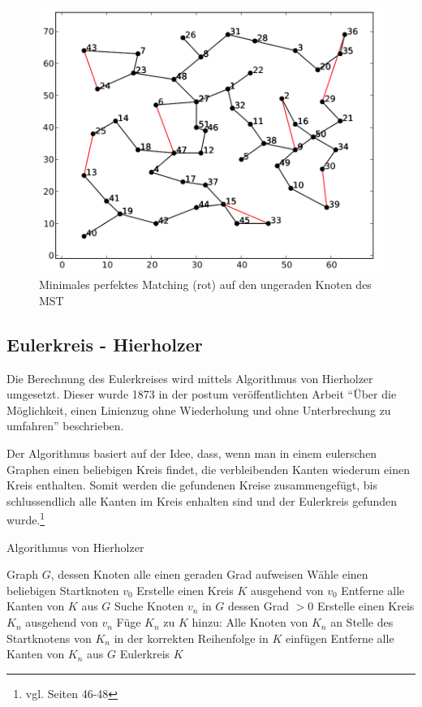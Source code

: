 \documentclass[11pt,a4paper]{article}
\begin{document}
\begin{figure}[H]
        \centering
        \includegraphics[width=12cm]{gfx/eil51_pm}
        \caption{Minimales perfektes Matching (rot) auf den ungeraden Knoten des MST}
        \label{img:eil51_pm}
\end{figure}

\newpage

\subsection{Eulerkreis - Hierholzer}
Die Berechnung des Eulerkreises wird mittels Algorithmus von Hierholzer umgesetzt. Dieser wurde 1873 in der postum veröffentlichten Arbeit "`Über die Möglichkeit, einen Linienzug ohne Wiederholung und ohne Unterbrechung zu umfahren"'\cite{hierholzer73} beschrieben.

Der Algorithmus basiert auf der Idee, dass, wenn man in einem eulerschen Graphen einen beliebigen Kreis findet, die verbleibenden Kanten wiederum einen Kreis enthalten. Somit werden die gefundenen Kreise zusammengefügt, bis schlussendlich alle Kanten im Kreis enhalten sind und der Eulerkreis gefunden wurde.\footnote{vgl. \cite{krumke05} Seiten 46-48}

\begin{algorithm}[H]
    \renewcommand{\algorithmicrequire}{\textbf{Eingabe:}}
    \renewcommand{\algorithmicensure}{\textbf{Ausgabe:}}
    \caption{Algorithmus von Hierholzer}

    \begin{algorithmic}[1]
    \REQUIRE Graph $G$, dessen Knoten alle einen geraden Grad aufweisen
        \STATE Wähle einen beliebigen Startknoten $v_0$
        \STATE Erstelle einen Kreis $K$ ausgehend von $v_0$
        \STATE Entferne alle Kanten von $K$ aus $G$
            \STATE Suche Knoten $v_n$ in $G$ dessen Grad $> 0$
            \STATE Erstelle einen Kreis $K_n$ ausgehend von $v_n$
            \STATE Füge $K_n$ zu $K$ hinzu: Alle Knoten von $K_n$ an Stelle des Startknotens von $K_n$ in der korrekten Reihenfolge in $K$ einfügen
            \STATE Entferne alle Kanten von $K_n$ aus $G$
        \ENDWHILE
    \ENSURE Eulerkreis $K$
    \end{algorithmic}
\end{algorithm}
\end{document}
